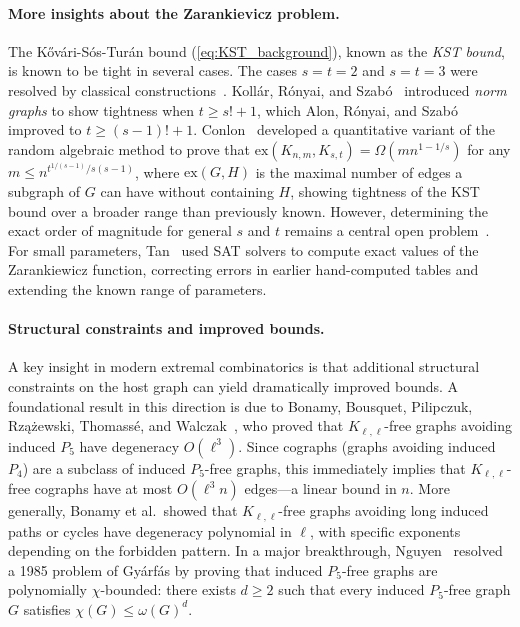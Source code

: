 \documentclass{article}
\theoremstyle{definition}
\theoremstyle{definition}
\theoremstyle{definition}
\theoremstyle{definition}
\theoremstyle{definition}
\theoremstyle{definition}
\theoremstyle{definition}
\theoremstyle{definition}
\theoremstyle{definition}
\theoremstyle{definition}
\begin{document}
\paragraph{More insights about the Zarankievicz problem.}
The K\H{o}v\'ari-S\'os-Tur\'an bound (\ref{eq:KST_background}), known as the \emph{KST bound}, is known to be tight in several cases.
The cases $s = t = 2$ and $s = t = 3$ were resolved by classical constructions~\cite{Furedi2013}.
Koll\'ar, R\'onyai, and Szab\'o~\cite{KollarRonyaiSzabo1996} introduced \emph{norm graphs} to show tightness when $t \geq s! + 1$, which Alon, R\'onyai, and Szab\'o~\cite{AlonRonyaiSzabo1999} improved to $t \geq (s-1)! + 1$.
Conlon~\cite{Conlon2022_someRemarksZarankievicz} developed a quantitative variant of the random algebraic method to prove that $\text{ex}(K_{n,m}, K_{s,t}) = \Omega(mn^{1-1/s})$ for any $m \leq n^{t^{1/(s-1)}/s(s-1)}$, where $\text{ex}(G,H)$ is the maximal number of edges a subgraph of $G$ can have without containing $H$, showing tightness of the KST bound over a broader range than previously known.
However, determining the exact order of magnitude for general $s$ and $t$ remains a central open problem~\cite{Furedi2013, Smorodinsky2023}.
For small parameters, Tan~\cite{Tan2022_zarankieviczSAT} used SAT solvers to compute exact values of the Zarankiewicz function, correcting errors in earlier hand-computed tables and extending the known range of parameters.

\paragraph{Structural constraints and improved bounds.}
A key insight in modern extremal combinatorics is that additional structural constraints on the host graph can yield dramatically improved bounds.
A foundational result in this direction is due to Bonamy, Bousquet, Pilipczuk, Rz\k{a}\.{z}ewski, Thomass\'e, and Walczak~\cite{Bonamy2020}, who proved that $K_{\ell,\ell}$-free graphs avoiding induced $P_5$ have degeneracy $O(\ell^3)$.
Since cographs (graphs avoiding induced $P_4$) are a subclass of induced $P_5$-free graphs, this immediately implies that $K_{\ell,\ell}$-free cographs have at most $O(\ell^3 n)$ edges---a linear bound in $n$.
More generally, Bonamy et al.\ showed that $K_{\ell,\ell}$-free graphs avoiding long induced paths or cycles have degeneracy polynomial in $\ell$, with specific exponents depending on the forbidden pattern.
In a major breakthrough, Nguyen~\cite{Nguyen2025} resolved a 1985 problem of Gy\'arf\'as by proving that induced $P_5$-free graphs are polynomially $\chi$-bounded: there exists $d \geq 2$ such that every induced $P_5$-free graph $G$ satisfies $\chi(G) \leq \omega(G)^d$.
\end{document}
